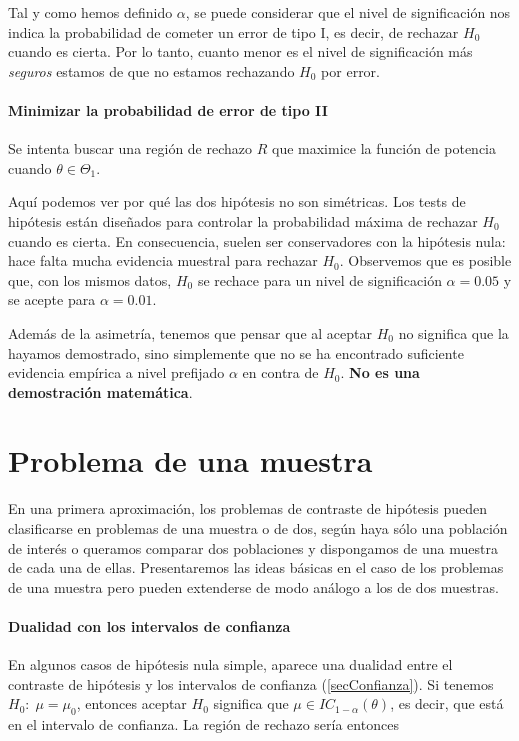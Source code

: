 \documentclass{apuntes}
\begin{document}
Tal y como hemos definido $α$, se puede considerar que el nivel de significación nos indica la probabilidad de cometer un error de tipo I, es decir, de rechazar $H_0$ cuando es cierta. Por lo tanto, cuanto menor es el nivel de significación más \textit{seguros} estamos de que no estamos rechazando $H_0$ por error.

\paragraph{Minimizar la probabilidad de error de tipo II}

Se intenta buscar una región de rechazo $R$ que maximice la función de potencia cuando $θ∈Θ_1$.

Aquí podemos ver por qué las dos hipótesis no son simétricas. Los tests de hipótesis están diseñados para controlar la probabilidad máxima de rechazar $H_0$ cuando es cierta. En consecuencia, suelen ser conservadores con la hipótesis nula: hace falta mucha evidencia muestral para rechazar $H_0$. Observemos que es posible que, con los mismos datos, $H_0$ se rechace para un nivel de significación $α=0.05$ y se acepte para $α=0.01$. 

Además de la asimetría, tenemos que pensar que al aceptar $H_0$ no significa que la hayamos demostrado, sino simplemente que no se ha encontrado suficiente evidencia empírica a nivel prefijado $α$ en contra de $H_0$. \textbf{No es una demostración matemática}.

\section{Problema de una muestra}

En una primera aproximación, los problemas de contraste de hipótesis  pueden clasificarse en problemas de una muestra o de dos, según haya sólo una población de interés o queramos comparar dos poblaciones y dispongamos de una muestra de cada una de ellas. Presentaremos las ideas básicas en el caso de los problemas de una muestra pero pueden extenderse de modo análogo a los de dos muestras. 

\paragraph{Dualidad con los intervalos de confianza}

En algunos casos de hipótesis nula simple, aparece una dualidad entre el contraste de hipótesis y los intervalos de confianza (\ref{secConfianza}). Si tenemos $H_0:\; μ=μ_0$, entonces aceptar $H_0$ significa que $μ ∈ IC_{1-α}(θ)$, es decir, que está en el intervalo de confianza. La región de rechazo sería entonces
\end{document}
